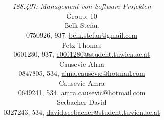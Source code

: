\documentclass[a4paper,11pt]{article}
\title{\textbf{\sffamily\Huge \ShortTitle}\\ 
{\textbf{\sffamily\Large \FullTitle}}
\vspace{1cm}}
\author{
{\em 188.407: Management von Software Projekten} \vspace{1cm} \\
Group: 10\bigskip \\
Belk Stefan \\ {\small 0750926, 937, \href{mailto:belk.stefan@gmail.com}{belk.stefan@gmail.com}}\\
Petz Thomas \\ {\small 0601280, 937, \href{mailto:e0601280@student.tuwien.ac.at}{e0601280@student.tuwien.ac.at}}\\
Causevic Alma \\ {\small 0847805, 534, \href{mailto:alma.causevic@hotmail.com}{alma.causevic@hotmail.com}}\\ 
Causevic Amra  \\ {\small 0649241, 534, \href{mailto:amra.causevic@hotmail.com}{amra.causevic@hotmail.com}}\\ 
Seebacher David \\ {\small 0327243, 534, \href{mailto:david.seebacher@student.tuwien.ac.at}{david.seebacher@student.tuwien.ac.at}}\\
\vspace{4cm}
}
\begin{document}
\begin{titlepage}
\maketitle

\end{titlepage}


%
%

\end{document}

